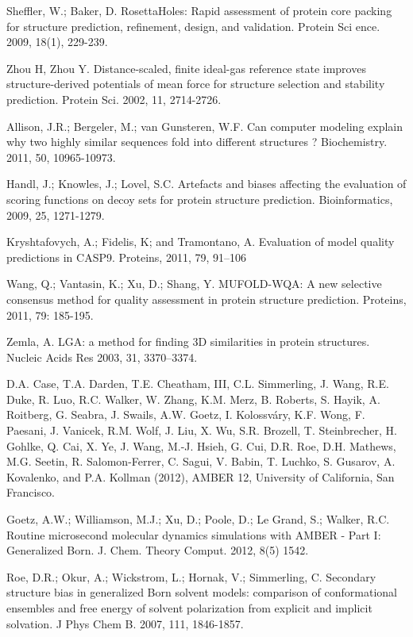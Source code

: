 \documentclass[12pt]{article}
\begin{document}
\begin{thebibliography}{99}
Sheffler, W.; Baker, D. RosettaHoles: Rapid assessment of protein core packing for structure prediction, refinement, design, and validation. Protein Sci
ence. 2009, 18(1), 229-239.

Zhou H, Zhou Y. Distance-scaled, finite ideal-gas reference state improves structure-derived potentials of mean force for structure selection and
stability prediction. Protein Sci. 2002, 11, 2714-2726.

Allison, J.R.; Bergeler, M.; van Gunsteren, W.F. Can computer modeling explain why two highly similar sequences fold into different structures ?
Biochemistry. 2011, 50, 10965-10973. 

Handl, J.; Knowles, J.; Lovel, S.C. Artefacts and biases affecting the evaluation of scoring
functions on decoy sets for protein structure prediction. Bioinformatics, 2009, 25, 1271-1279.

Kryshtafovych, A.; Fidelis, K; and Tramontano, A. Evaluation of model quality predictions in CASP9. Proteins, 2011, 79, 91–106

Wang, Q.; Vantasin, K.; Xu, D.; Shang, Y. MUFOLD-WQA: A new selective consensus method for quality assessment in protein structure prediction.
Proteins, 2011, 79: 185-195.

Zemla, A. LGA: a method for finding 3D similarities in protein structures. Nucleic Acids Res 2003, 31, 3370–3374.

D.A. Case, T.A. Darden, T.E. Cheatham, III, C.L. Simmerling, J. Wang, R.E. Duke, R. Luo, R.C. Walker, W. Zhang, K.M. Merz, B. Roberts, S. Hayik, A. Roitberg, G. Seabra, J. Swails, A.W. Goetz, I. Kolossváry, K.F. Wong, F. Paesani, J. Vanicek, R.M. Wolf, J. Liu, X. Wu, S.R. Brozell, T. Steinbrecher, H. Gohlke, Q. Cai, X. Ye, J. Wang, M.-J. Hsieh, G. Cui, D.R. Roe, D.H. Mathews, M.G. Seetin, R. Salomon-Ferrer, C. Sagui, V. Babin, T. Luchko, S. Gusarov, A. Kovalenko, and P.A. Kollman (2012), AMBER 12, University of California, San Francisco.

Goetz, A.W.; Williamson, M.J.; Xu, D.; Poole, D.; Le Grand, S.; Walker, R.C. Routine microsecond molecular dynamics simulations with AMBER - Part I: Generalized
Born. J. Chem. Theory Comput. 2012, 8(5) 1542.

Roe, D.R.; Okur, A.; Wickstrom, L.; Hornak, V.; Simmerling, C. Secondary structure bias in generalized Born solvent models: comparison of conformational ensembles 
and free energy of solvent polarization from explicit and implicit solvation. J Phys Chem B. 2007, 111, 1846-1857.


\end{thebibliography}
\end{document}
